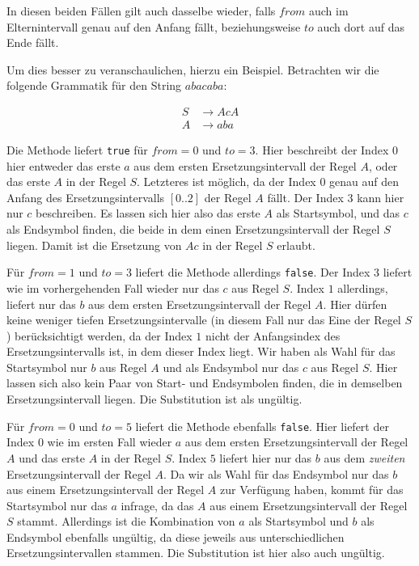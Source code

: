 In diesen beiden Fällen gilt auch dasselbe wieder, falls $from$ auch im Elternintervall genau auf den Anfang fällt, beziehungsweise $to$ auch dort auf das Ende fällt.

Um dies besser zu veranschaulichen, hierzu ein Beispiel. Betrachten wir die folgende Grammatik für den String $abacaba$:

\begin{align*}
    S &\rightarrow AcA\\
    A &\rightarrow aba
\end{align*}

Die Methode liefert \texttt{true} für $from=0$ und $to=3$. Hier beschreibt der Index $0$ hier entweder das erste $a$ aus dem ersten Ersetzungsintervall der Regel $A$, oder das erste $A$ in der Regel $S$. Letzteres ist möglich, da der Index $0$ genau auf den Anfang des Ersetzungsintervalls $[0..2]$ der Regel $A$ fällt. Der Index $3$ kann hier nur $c$ beschreiben.
Es lassen sich hier also das erste $A$ als Startsymbol, und das $c$ als Endsymbol finden, die beide in dem einen Ersetzungsintervall der Regel $S$ liegen. Damit ist die Ersetzung von $Ac$ in der Regel $S$ erlaubt.

Für $from=1$ und $to=3$ liefert die Methode allerdings \texttt{false}. Der Index $3$ liefert wie im vorhergehenden Fall wieder nur das $c$ aus Regel $S$.
Index $1$ allerdings, liefert nur das $b$ aus dem ersten Ersetzungsintervall der Regel $A$. Hier dürfen keine weniger tiefen Ersetzungsintervalle (in diesem Fall nur das Eine der Regel $S$) berücksichtigt werden, da der Index $1$ nicht der Anfangsindex des Ersetzungsintervalls ist, in dem dieser Index liegt.
Wir haben als Wahl für das Startsymbol nur $b$ aus Regel $A$ und als Endsymbol nur das $c$ aus Regel $S$. Hier lassen sich also kein Paar von Start- und Endsymbolen finden, die in demselben Ersetzungsintervall liegen. Die Substitution ist als ungültig.

Für $from=0$ und $to=5$ liefert die Methode ebenfalls \texttt{false}. Hier liefert der Index $0$ wie im ersten Fall wieder $a$ aus dem ersten Ersetzungsintervall der Regel $A$ und das erste $A$ in der Regel $S$. Index $5$ liefert hier nur das $b$ aus dem \textit{zweiten} Ersetzungsintervall der Regel $A$. 
Da wir als Wahl für das Endsymbol nur das $b$ aus einem Ersetzungsintervall der Regel $A$ zur Verfügung haben, kommt für das Startsymbol nur das $a$ infrage, da das $A$ aus einem Ersetzungsintervall der Regel $S$ stammt.
Allerdings ist die Kombination von $a$ als Startsymbol und $b$ als Endsymbol ebenfalls ungültig, da diese jeweils aus unterschiedlichen Ersetzungsintervallen stammen.
Die Substitution ist hier also auch ungültig.

